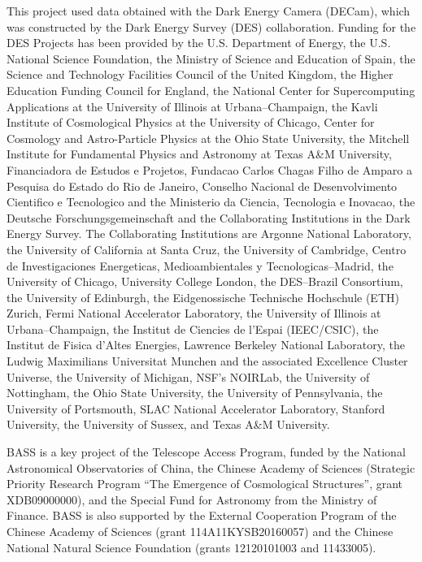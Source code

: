 This project used data obtained with the Dark Energy Camera (DECam), which was
constructed by the Dark Energy Survey (DES) collaboration. Funding for the DES
Projects has been provided by the U.S. Department of Energy, the U.S. National
Science Foundation, the Ministry of Science and Education of Spain, the
Science and Technology Facilities Council of the United Kingdom, the Higher
Education Funding Council for England, the National Center for Supercomputing
Applications at the University of Illinois at Urbana--Champaign, the Kavli
Institute of Cosmological Physics at the University of Chicago, Center for
Cosmology and Astro-Particle Physics at the Ohio State University, the
Mitchell Institute for Fundamental Physics and Astronomy at Texas A\&M
University, Financiadora de Estudos e Projetos, Fundacao Carlos Chagas Filho
de Amparo a Pesquisa do Estado do Rio de Janeiro, Conselho Nacional de
Desenvolvimento Cientifico e Tecnologico and the Ministerio da Ciencia,
Tecnologia e Inovacao, the Deutsche Forschungsgemeinschaft and the
Collaborating Institutions in the Dark Energy Survey. The Collaborating
Institutions are Argonne National Laboratory, the University of California at
Santa Cruz, the University of Cambridge, Centro de Investigaciones
Energeticas, Medioambientales y Tecnologicas--Madrid, the University of
Chicago, University College London, the DES--Brazil Consortium, the University
of Edinburgh, the Eidgenossische Technische Hochschule (ETH) Zurich, Fermi
National Accelerator Laboratory, the University of Illinois at
Urbana--Champaign, the Institut de Ciencies de l'Espai (IEEC/CSIC), the
Institut de Fisica d'Altes Energies, Lawrence Berkeley National Laboratory,
the Ludwig Maximilians Universitat Munchen and the associated Excellence
Cluster Universe, the University of Michigan, NSF's NOIRLab, the University
of Nottingham, the Ohio State University, the University of Pennsylvania, the
University of Portsmouth, SLAC National Accelerator Laboratory, Stanford
University, the University of Sussex, and Texas A\&M University.

BASS is a key project of the Telescope Access Program, funded by the National
Astronomical Observatories of China, the Chinese Academy of Sciences (Strategic
Priority Research Program ``The Emergence of Cosmological Structures'', grant
XDB09000000), and the Special Fund for Astronomy from the Ministry of Finance.
BASS is also supported by the External Cooperation Program of the Chinese
Academy of Sciences (grant 114A11KYSB20160057) and the Chinese National Natural
Science Foundation (grants 12120101003 and 11433005).

